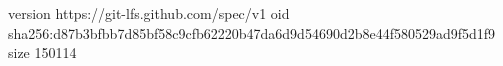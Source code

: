 version https://git-lfs.github.com/spec/v1
oid sha256:d87b3bfbb7d85bf58c9cfb62220b47da6d9d54690d2b8e44f580529ad9f5d1f9
size 150114
